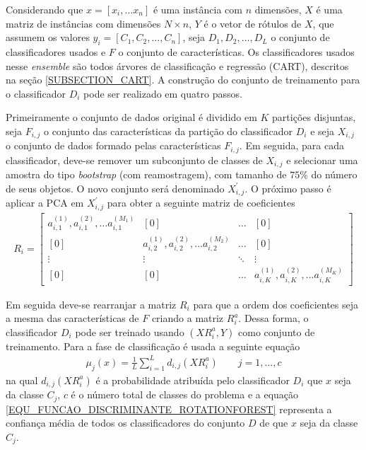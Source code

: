 Considerando que \(x = [x_{i}, \ldots x_{n}]\) é uma instância com \(n\) dimensões, \(X\) é uma matriz de instâncias com dimensões \(N \times n\), \(Y\) é o vetor de rótulos de \(X\), que assumem os valores \(y_{i} = [C_{1}, C_{2}, \ldots, C_{n}]\), seja \(D_{1}, D_{2}, \ldots, D_{L}\) o conjunto de classificadores usados e \(F\) o conjunto de características. Os classificadores usados nesse \emph{ensemble} são todos árvores de classificação e regressão (CART), descritos na seção \ref{SUBSECTION_CART}. A construção do conjunto de treinamento para o classificador \(D_{i}\) pode ser realizado em quatro passos.

Primeiramente o conjunto de dados original é dividido em \(K\) partições disjuntas, seja \(F_{i,j}\) o conjunto das características da partição do classificador \(D_{i}\) e seja \(X_{i,j}\) o conjunto de dados formado pelas características \(F_{i,j}\). Em seguida, para cada classificador, deve-se remover um subconjunto de classes de \(X_{i,j}\) e selecionar uma amostra do tipo \emph{bootstrap} (com reamostragem), com tamanho de \(75\%\) do número de seus objetos. O novo conjunto será denominado \(X_{i,j}^{'}\). O próximo passo é aplicar a PCA em \(X_{i,j}^{'}\) para obter a seguinte matriz de coeficientes
\begin{align}
R_{i} =
\begin{bmatrix}
    a_{i,1}^{(1)}, a_{i,1}^{(2)}, \dots a_{i,1}^{(M_{1})} & [0] 												  & \dots  & [0] \\
    [0] 												  & a_{i,2}^{(1)}, a_{i,2}^{(2)}, \dots a_{i,2}^{(M_{2})} & \dots  & [0] \\
    \vdots 												  & \vdots 												  & \ddots & \vdots \\
    [0] 												  & [0] & \dots  & a_{i,K}^{(1)}, a_{i,K}^{(2)}, \dots a_{i,K}^{(M_{K})}
\end{bmatrix}
\end{align}

Em seguida deve-se rearranjar a matriz \(R_{i}\) para que a ordem dos coeficientes seja a mesma das características de \(F\) criando a matriz \(R_{i}^{a}\). Dessa forma, o classificador \(D_{i}\) pode ser treinado usando \((XR_{i}^{a}, Y)\) como conjunto de treinamento. Para a fase de classificação é usada a seguinte equação
\begin{align}
\mu_{j}(x) = \frac{1}{L}\sum\limits_{i=1}^{L} d_{i,j}(XR_{i}^{a})  \qquad j = 1, \ldots, c \label{EQU_FUNCAO_DISCRIMINANTE_ROTATIONFOREST}
\end{align}
na qual \(d_{i,j}(XR_{i}^{a})\) é a probabilidade atribuída pelo classificador \(D_{i}\) que \(x\) seja da classe \(C_{j}\), \(c\) é o número total de classes do problema e a equação \eqref{EQU_FUNCAO_DISCRIMINANTE_ROTATIONFOREST} representa a confiança média de todos os classificadores do conjunto \(D\) de que \(x\) seja da classe \(C_{j}\).
